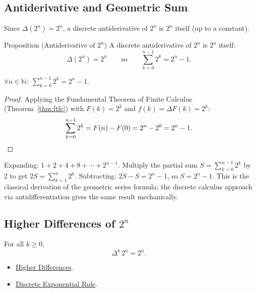 \subsection*{Antiderivative and Geometric Sum}

Since \(\Delta(2^n) = 2^n\), a discrete antiderivative of \(2^n\) is \(2^n\)
itself (up to a constant).

\begin{propositionbox}{Proposition (Antiderivative of \(2^n\))}
A discrete antiderivative of \(2^n\) is \(2^n\) itself:
\[
\Delta(2^n) = 2^n
\qquad \text{so} \qquad
\sum_{k=0}^{n-1} 2^k = 2^n - 1.
\]
\end{propositionbox}
\label{prop:antideriv-two-n}

\begin{remark*}
\(\forall n \in \mathbb{N}:\;
\displaystyle\sum_{k=0}^{n-1} 2^k = 2^n - 1\).
\end{remark*}

\begin{proof}
Applying the Fundamental Theorem of Finite Calculus
(Theorem~\ref{thm:ftfc}) with \(F(k) = 2^k\) and \(f(k) = \Delta F(k) = 2^k\):
\[
\sum_{k=0}^{n-1} 2^k = F(n) - F(0) = 2^n - 2^0 = 2^n - 1. \qedhere
\]
\end{proof}

\begin{remark*}
Expanding: \(1 + 2 + 4 + 8 + \cdots + 2^{n-1}\). Multiply the partial sum
\(S = \sum_{k=0}^{n-1}2^k\) by \(2\) to get \(2S = \sum_{k=1}^{n}2^k\).
Subtracting: \(2S - S = 2^n - 1\), so \(S = 2^n - 1\). This is the
classical derivation of the geometric series formula; the discrete calculus
approach via antidifferentiation gives the same result mechanically.
\end{remark*}

\subsection*{\texorpdfstring{Higher Differences of \(2^n\)}{Higher Differences of 2 to the n}}

\begin{proposition}
\label{prop:higher-diff-two-n}
For all \(k \ge 0\),
\[
\Delta^k\, 2^n = 2^n.
\]
\end{proposition}

\begin{dependencies}
\begin{itemize}
  \item \hyperref[def:higher-differences]{Higher Differences}.
  \item \hyperref[prop:discrete-exponential-rule]{Discrete Exponential Rule}.
\end{itemize}
\end{dependencies}

